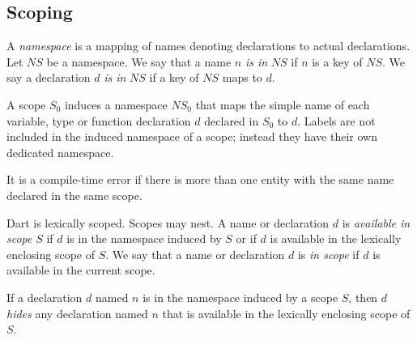 \documentclass{article}
\begin{document}

\subsection{Scoping}

\LMHash{}
A {\em namespace} is a mapping of names denoting declarations to actual declarations.  Let $NS$ be a namespace. We say that a name $n$ {\em is in }$NS$ if $n$ is a key of $NS$. We say a declaration $d$ {\em is in }$NS$ if a key of $NS$ maps to $d$.

\LMHash{}
A scope $S_0$ induces a namespace $NS_0$ that maps the simple name of each variable, type or function declaration $d$ declared in $S_0$ to $d$. Labels are not included in the induced namespace of a scope; instead they have their own dedicated namespace.

  
\LMHash{}
It is a compile-time error if there is more than one entity with the same name declared in the same scope.


\LMHash{}
Dart is lexically scoped.    Scopes may nest.  A name or declaration $d$ is {\em available in scope} $S$ if $d$ is in the namespace induced by $S$ or if $d$ is available in the lexically enclosing scope of $S$. We  say that a name or declaration $d$ is {\em in scope} if $d$ is available in the current scope. 


\LMHash{}
If a  declaration $d$ named $n$ is in the namespace induced by a scope $S$, then $d$ {\em hides} any declaration named $n$ that is available in the lexically enclosing scope of $S$. 

\end{document}
